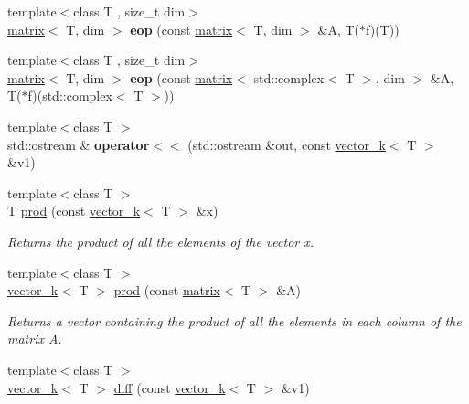 \begin{DoxyCompactItemize}
\item 
\hypertarget{namespacekeycpp_a46e135aeca12d58b9a084413bf571783}{{\footnotesize template$<$class T , size\-\_\-t dim$>$ }\\\hyperlink{classkeycpp_1_1matrix}{matrix}$<$ T, dim $>$ {\bfseries eop} (const \hyperlink{classkeycpp_1_1matrix}{matrix}$<$ T, dim $>$ \&A, T($\ast$f)(T))}\label{namespacekeycpp_a46e135aeca12d58b9a084413bf571783}

\item 
\hypertarget{namespacekeycpp_a2309a6456fab18ec68a436f269d32d8f}{{\footnotesize template$<$class T , size\-\_\-t dim$>$ }\\\hyperlink{classkeycpp_1_1matrix}{matrix}$<$ T, dim $>$ {\bfseries eop} (const \hyperlink{classkeycpp_1_1matrix}{matrix}$<$ std\-::complex$<$ T $>$, dim $>$ \&A, T($\ast$f)(std\-::complex$<$ T $>$))}\label{namespacekeycpp_a2309a6456fab18ec68a436f269d32d8f}

\item 
\hypertarget{namespacekeycpp_a86f8946c126102b4467b70da16766b7a}{{\footnotesize template$<$class T $>$ }\\std\-::ostream \& {\bfseries operator$<$$<$} (std\-::ostream \&out, const \hyperlink{classkeycpp_1_1vector__k}{vector\-\_\-k}$<$ T $>$ \&v1)}\label{namespacekeycpp_a86f8946c126102b4467b70da16766b7a}

\item 
\hypertarget{namespacekeycpp_add55ad2a40111d6368744a3d4144f25a}{{\footnotesize template$<$class T $>$ }\\T \hyperlink{namespacekeycpp_add55ad2a40111d6368744a3d4144f25a}{prod} (const \hyperlink{classkeycpp_1_1vector__k}{vector\-\_\-k}$<$ T $>$ \&x)}\label{namespacekeycpp_add55ad2a40111d6368744a3d4144f25a}

\begin{DoxyCompactList}\small\item\em Returns the product of all the elements of the vector x. \end{DoxyCompactList}\item 
\hypertarget{namespacekeycpp_af5471fc9074471701bde9e68eb7971b4}{{\footnotesize template$<$class T $>$ }\\\hyperlink{classkeycpp_1_1vector__k}{vector\-\_\-k}$<$ T $>$ \hyperlink{namespacekeycpp_af5471fc9074471701bde9e68eb7971b4}{prod} (const \hyperlink{classkeycpp_1_1matrix}{matrix}$<$ T $>$ \&A)}\label{namespacekeycpp_af5471fc9074471701bde9e68eb7971b4}

\begin{DoxyCompactList}\small\item\em Returns a vector containing the product of all the elements in each column of the matrix A. \end{DoxyCompactList}\item 
\hypertarget{namespacekeycpp_a52c37ec9c41349fd6bd862b8ebdd01bb}{{\footnotesize template$<$class T $>$ }\\\hyperlink{classkeycpp_1_1vector__k}{vector\-\_\-k}$<$ T $>$ \hyperlink{namespacekeycpp_a52c37ec9c41349fd6bd862b8ebdd01bb}{diff} (const \hyperlink{classkeycpp_1_1vector__k}{vector\-\_\-k}$<$ T $>$ \&v1)}\label{namespacekeycpp_a52c37ec9c41349fd6bd862b8ebdd01bb}


\end{DoxyCompactItemize}
